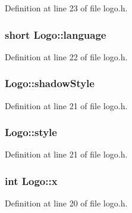Definition at line 23 of file logo.\-h.

\hypertarget{class_logo_ac3f13aa3fd16b904a71157e6ff47e48e}{
\subsubsection[{language}]{\setlength{\rightskip}{0pt plus 5cm}short Logo\-::language\hspace{0.3cm}{\ttfamily [private]}}}\label{class_logo_ac3f13aa3fd16b904a71157e6ff47e48e}


Definition at line 22 of file logo.\-h.

\hypertarget{class_logo_a73d851ecd0cf3b7513f47df2aa462142}{
\subsubsection[{shadow\-Style}]{ Logo\-::shadow\-Style\hspace{0.3cm}{\ttfamily [private]}}}\label{class_logo_a73d851ecd0cf3b7513f47df2aa462142}


Definition at line 21 of file logo.\-h.

\hypertarget{class_logo_a2a0115dd4566f475c108eb3728265b62}{
\subsubsection[{style}]{ Logo\-::style\hspace{0.3cm}{\ttfamily [private]}}}\label{class_logo_a2a0115dd4566f475c108eb3728265b62}


Definition at line 21 of file logo.\-h.

\hypertarget{class_logo_ab25a813d9b3635c4b524dab9bc2ee86e}{
\subsubsection[{x}]{\setlength{\rightskip}{0pt plus 5cm}int Logo\-::x\hspace{0.3cm}{\ttfamily [private]}}}\label{class_logo_ab25a813d9b3635c4b524dab9bc2ee86e}


Definition at line 20 of file logo.\-h.

